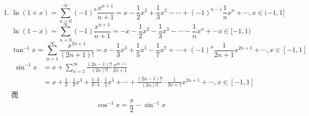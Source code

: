 \begin{enumerate}
	对于 $\alpha = \dfrac{1}{2}$，
	\[\begin{aligned}
		\sqrt{1+x} &=1 + \frac{1}{2}x+\sum_{k=2}^{\infty}\dfrac{(2k-3)!!}{(2k)!!}\\
		&= 1 + \frac{1}{2}x - \frac{1}{2 \cdot 4}x^2 + \frac{1 \cdot 3}{2 \cdot 4 \cdot 6}x^3 - \cdots + (-1)^{n-1} \frac{(2n-3)!!}{(2n)!!}x^n + \cdots
	\end{aligned}
	\]
	对于 $\alpha = -\dfrac{1}{2}$，
	\[\begin{aligned}
		\frac{1}{\sqrt{1+x}}&=\sum_{n=0}^{\infty}(-1)^n \frac{(2n-1)!!}{(2n)!!}\\&= 1 - \frac{1}{2}x + \frac{1 \cdot 3}{2 \cdot 4}x^2 - \frac{1 \cdot 3 \cdot 5}{2 \cdot 4 \cdot 6}x^3 + \cdots + (-1)^n \frac{(2n-1)!!}{(2n)!!}x^n +\cdots
	\end{aligned}
	\]
	使用代换法
	\[
	\frac{1}{1-x} =\sum_{x=0}^{\infty}x^n 
	\]
	\[
	\frac{1}{1+x^2} = \sum_{x=0}^{\infty}(-1)^nx^{2n}
	\]
	\[
	\frac{1}{1-x^2} = \sum_{x=0}^{\infty}x^{2n}
	\]
	\item 
	\[
	\ln(1+x) = \sum_{n=0}^{\infty}(-1)^n\frac{x^{n+1}}{n+1}=x - \frac{1}{2}x^2 + \frac{1}{3}x^3 - \cdots + (-1)^{n-1} \frac{1}{n} x^n + \cdots,x\in(-1,1]
	\]
	\[
	\ln(1-x) =\sum_{n=0}^{\infty}(-1)\frac{x^{n+1}}{n+1}= -x - \frac{1}{2}x^2 - \frac{1}{3}x^3 - \cdots - \frac{1}{n}x^n + \cdots
	x\in[-1,1)\]
	\[
	\tan^{-1} x=\sum_{n=1}^{\infty}\frac{x^{2n+1}}{(2n+1)!} = x - \frac{1}{3}x^3 + \frac{1}{5}x^5 - \frac{1}{7}x^7 + \cdots + (-1)^n \frac{1}{2n+1} x^{2n+1} + \cdots,x\in[-1,1]
	\]
	\[\begin{aligned}
		\sin^{-1} x&=x+\sum_{n=1}^{\infty}\frac{(2n-1)!!}{(2n)!!}\frac{x^{2n+1}}{2n+1}\\ &= x + \frac{1}{2} \cdot \frac{1}{3} x^3 + \frac{1 \cdot 3}{2 \cdot 4} \cdot \frac{1}{5} x^5 + \cdots + \frac{(2n-1)!!}{(2n)!!} \cdot \frac{1}{2n+1} x^{2n+1} + \cdots,x\in[-1,1]
	\end{aligned}
	\]
	而
	\[
	\cos^{-1} x = \frac{\pi}{2} - \sin^{-1} x
	\]
\end{enumerate}
